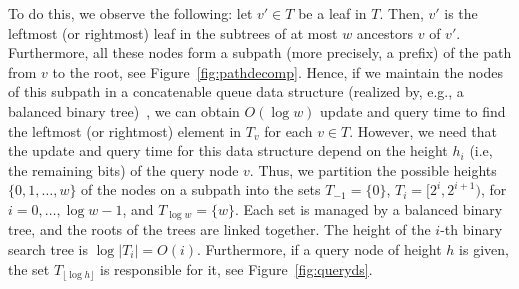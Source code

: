 \documentclass[a4paper,11pt]{article}
\newcommand{\?}{\mskip1.5mu}
\begin{document}
To do this, we observe the following: let $v' \in T$ be 
a leaf in $T$. Then, $v'$ is the leftmost (or rightmost)
leaf in the subtrees of at most $w$ ancestors $v$ of $v'$.
Furthermore, all these nodes form a subpath (more precisely,
a prefix) of the path from $v$ to the root, see Figure~\ref{fig:pathdecomp}.
Hence, if we maintain the nodes of 
this subpath in a concatenable queue data structure
(realized by, e.g., a balanced binary tree)~\cite{PreparateSh85},
we can obtain $O(\log w)$ update and query time
to find the leftmost (or rightmost) element in $T_v$
for each $v \in T$.
However, we need that the update and query time for this
data structure
depend on the height $h_i$ (i.e, the remaining bits) 
of the query node $v$.
Thus, we partition the possible heights
$\{0, 1, \dots, w\}$ of the nodes on a 
subpath into the sets
$T_{-1} = \{0\}$, $T_i =[2^i, 2^{i+1})$, for $i = 0,\dots,\log w-1$, 
and $T_{\log w} = \{w\}$.
Each set is managed by a balanced binary tree, and the 
roots of the trees are linked together. The height of the $i$-th binary 
search tree is $\log |T_i| = O(i)$. Furthermore, if a query node
of height $h$ is given, 
the set $T_{\lfloor \log h \rfloor}$ is responsible for it, see 
Figure~\ref{fig:queryds}.
\end{document}
